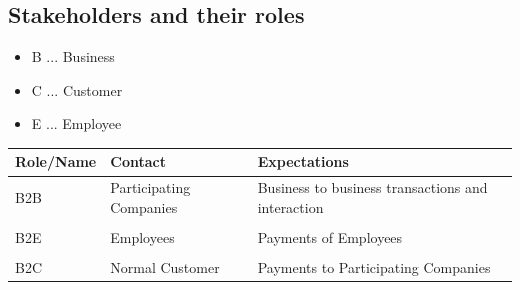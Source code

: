 \subsection{Stakeholders and their roles}\label{_stakeholders}

\begin{itemize}
	\item B ... Business
	\item C ... Customer
	\item E ... Employee	
\end{itemize}

\begin{longtable}[]{@{}lll@{}}
\toprule
\begin{minipage}[b]{0.18\columnwidth}\raggedright\strut
Role/Name\strut
\end{minipage} & \begin{minipage}[b]{0.37\columnwidth}\raggedright\strut
Contact\strut
\end{minipage} & \begin{minipage}[b]{0.37\columnwidth}\raggedright\strut
Expectations\strut
\end{minipage}\tabularnewline
\midrule
\endhead
\begin{minipage}[t]{0.18\columnwidth}B2B \end{minipage} &
\begin{minipage}[t]{0.37\columnwidth}Participating Companies \end{minipage} &
\begin{minipage}[t]{0.37\columnwidth}Business to business transactions and interaction\end{minipage}
\tabularnewline
\tabularnewline
\begin{minipage}[t]{0.18\columnwidth}B2E \end{minipage} &
\begin{minipage}[t]{0.37\columnwidth}Employees \end{minipage} &
\begin{minipage}[t]{0.37\columnwidth}Payments of Employees\end{minipage}
\tabularnewline
\tabularnewline
\begin{minipage}[t]{0.18\columnwidth}B2C \end{minipage} &
\begin{minipage}[t]{0.37\columnwidth}Normal Customer \end{minipage} &
\begin{minipage}[t]{0.37\columnwidth}Payments to Participating Companies\end{minipage}

\end{longtable}

